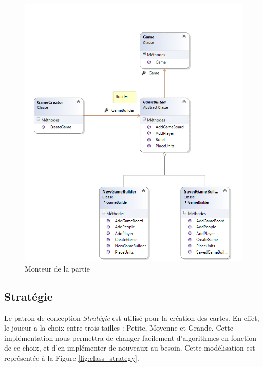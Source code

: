 \documentclass[a4paper]{article}
\begin{document}
\begin{figure}[ht]
\centering
	\includegraphics[width=\textwidth]{../Schemas/class_GameBoardBuilder_Builder.png}
		\caption{Monteur de la partie}
		\label{fig:class_builder}
\end{figure}

\clearpage
	\subsection{Stratégie}
Le patron de conception \textit{Stratégie} est utilisé pour la création des cartes. En effet, le joueur a la choix entre trois tailles : Petite, Moyenne et Grande. Cette implémentation nous permettra de changer facilement d'algorithmes en fonction de ce choix, et d'en implémenter de nouveaux au besoin. Cette modélisation est représentée à la Figure \ref{fig:class_strategy}.
\end{document}
